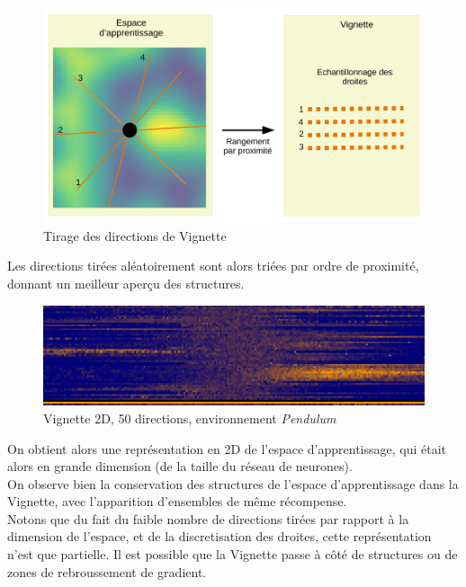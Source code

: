 \documentclass[12pt]{article}
\begin{document}
\begin{figure}[htp]
    \centering
    \includegraphics[width=12cm]{Images/VignetteDessin}
    \caption{Tirage des directions de Vignette}
    \label{fig:vignetteDessin}
\end{figure}

Les directions tirées aléatoirement sont alors triées par ordre de proximité, donnant un meilleur aperçu des structures. \\

\begin{figure}[htp]
    \centering
    \includegraphics[width=12cm]{Images/Vignette_pendulum}
    \caption{Vignette 2D, 50 directions, environnement \emph{Pendulum}}
    \label{fig:vignetteDessin}
\end{figure}

On obtient alors une représentation en 2D de l’espace d’apprentissage, qui était alors en grande dimension (de la taille du réseau de neurones). \\

On observe bien la conservation des structures de l'espace d'apprentissage dans la Vignette, avec l'apparition d'ensembles de même récompense. \\

Notons que du fait du faible nombre de directions tirées par rapport à la dimension de l'espace, et de la discretisation des droites, cette représentation n’est que partielle. Il est possible que la Vignette passe à côté de structures ou de zones de rebroussement de gradient. \\
\end{document}
